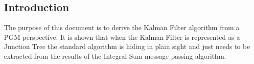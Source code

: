 \begin{center}
\section*{Introduction}
\end{center}
The purpose of this document is to derive the Kalman Filter algorithm from a PGM perspective. It is shown that when the Kalman Filter is represented as a Junction Tree the standard algorithm is hiding in plain sight and just needs to be extracted from the results of the Integral-Sum message passing algorithm.